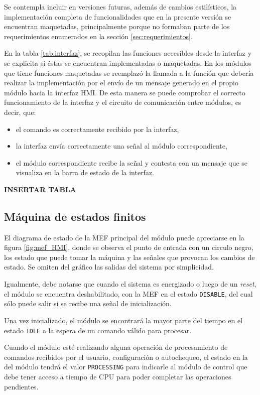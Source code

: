Se contempla incluir en versiones futuras, además de cambios estilísticos, la implementación completa de funcionalidades que en la presente versión se encuentran maquetadas, principalmente porque no formaban parte de los requerimientos enumerados en la sección \ref{sec:requerimientos}. 

En la tabla \ref{tab:interfaz}, se recopilan las funciones accesibles desde la interfaz y se explicita si éstas se encuentran implementadas o maquetadas. En los módulos que tiene funciones maquetadas se reemplazó la llamada a la función que debería realizar la implementación por el envío de un mensaje generado en el propio módulo hacia la interfaz HMI.  De esta manera se puede comprobar el correcto funcionamiento de la interfaz y el circuito de  comunicación entre módulos, es decir, que:

\begin{itemize}
	\item el comando es correctamente recibido por la interfaz,
	\item la interfaz envía correctamente una señal al módulo correspondiente,
	\item el módulo correspondiente recibe la señal y contesta con un mensaje que se visualiza en la barra de estado de la interfaz.
\end{itemize}

\textbf{INSERTAR TABLA}



\subsection{Máquina de estados finitos}

El diagrama de estado de la MEF principal del módulo puede apreciarse en la figura \ref{fig:mef_HMI}, donde se observa el punto de entrada con un circulo negro, los estado que puede tomar la máquina y las señales que provocan los cambios de estado. Se omiten del gráfico las salidas del sistema por simplicidad. 

Igualmente, debe notarse que cuando el sistema es energizado o luego de un \textit{reset}, el módulo se encuentra deshabilitado, con la MEF en el estado \texttt{DISABLE}, del cual sólo puede salir si se recibe una señal de inicialización.  

Una vez inicializado, el módulo se encontrará la mayor parte del tiempo en el estado \texttt{IDLE} a la espera de un comando válido para procesar.  

Cuando el módulo esté realizando alguna operación de procesamiento de comandos recibidos por el usuario, configuración o autochequeo, el estado en la del módulo tendrá el valor \texttt{PROCESSING} para indicarle al módulo de control que debe tener acceso a tiempo de CPU para poder completar las operaciones pendientes.  

